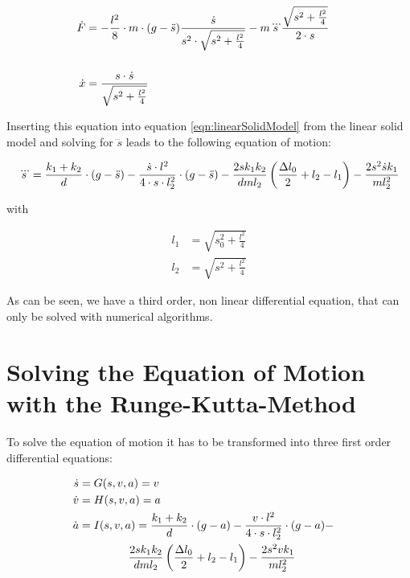 \begin{align}
	\dot F & \begin{multlined}[t]=  -\frac{l^2}{8}\cdot m \cdot (g - \ddot s) \frac{\dot s}{s^2 \cdot \sqrt{s^2 + \frac{l^2}{4}}} - \insertForSmartphone{\\}
	m \dddot s \frac{\sqrt{s^2 + \frac{l^2}{4}}}{2 \cdot s} \\
	\end{multlined}\\
	\dot x &= \frac{s \cdot \dot s}{\sqrt{s^2 + \frac{l^2}{4}}}
\end{align}

Inserting this equation into equation \ref{eqn:linearSolidModel} from the linear solid model and solving for $\dddot s$ leads to the following equation of motion:

\begin{equation}
\begin{split}
	\dddot s = \frac{k_1 + k_2}{d} \cdot (g - \ddot s) - 
	\frac{\dot s\cdot l^2}{4\cdot s \cdot l_2^2}\cdot (g - \ddot s) - 
	\frac{2sk_1k_2}{dml_2} \left(\frac{\Delta l_0}{2} + l_2 - l_1\right) - \frac{2s^2\dot s k_1}{ml_2^2}	
\end{split}
\label{eqn:equationOfEmotion}
\end{equation}

with

\begin{align}
	l_1 &= \sqrt{s_0^2 + \frac{l^2}{4}} \\
	l_2 &= \sqrt{s^2 + \frac{l^2}{4}}
\end{align}

As  can be seen, we have a third order, non linear differential equation, that can only be solved with numerical algorithms.

\section{Solving the Equation of Motion with the Runge-Kutta-Method }

To solve the equation of motion it has to be transformed into three first order differential equations:

\begin{align}
	\dot s &=G(s,v,a) = v \\
	\dot v &= H(s,v,a) = a \\
	\dot a &\begin{multlined}[t] = I(s,v,a) =\insertForSmartphone{\\} \frac{k_1 + k_2}{d} \cdot (g - a) - \frac{v\cdot l^2}{4\cdot s \cdot l_2^2} \cdot (g - a) - \\ \frac{2sk_1k_2}{dml_2} \left(\frac{\Delta l_0}{2} + l_2 - l_1\right) - \frac{2s^2v k_1}{ml_2^2} \\
	\end{multlined}
\end{align}

